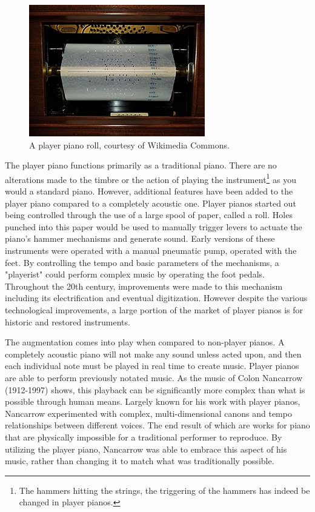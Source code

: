 \begin{figure}
    \centering
    \includegraphics[scale=0.8]{diagrams/PlayerPianoRoll.jpg}
    \caption{A player piano roll, courtesy of Wikimedia Commons.}
    \label{fig:pianoroll} %
\end{figure}

The player piano functions primarily as a traditional piano. There are no alterations made to the timbre or the action of playing the instrument\footnote{The hammers hitting the strings, the triggering of the hammers has indeed be changed in player pianos.} as you would a standard piano. However, additional features have been added to the player piano compared to a completely acoustic one. Player pianos started out being controlled through the use of a large spool of paper, called a roll\cite{plpHist}. Holes punched into this paper would be used to manually trigger levers to actuate the piano's hammer mechanisms and generate sound. Early versions of these instruments were operated with a manual pneumatic pump, operated with the feet\cite{plpHist}. By controlling the tempo and basic parameters of the mechanisms, a "playerist" could perform complex music by operating the foot pedals\cite{plpHist}. Throughout the 20th century, improvements were made to this mechanism including its electrification and eventual digitization\cite{modernPPBasics}. However despite the various technological improvements, a large portion of the market of player pianos is for historic and restored instruments.

The augmentation comes into play when compared to non-player pianos. A completely acoustic piano will not make any sound unless acted upon, and then each individual note must be played in real time to create music. Player pianos are able to perform previously notated music. As the music of Colon Nancarrow (1912-1997) shows, this playback can be significantly more complex than what is possible through human means. Largely known for his work with player pianos, Nancarrow experimented with complex, multi-dimensional canons and tempo relationships between different voices. The end result of which are works for piano that are physically impossible for a traditional performer to reproduce. By utilizing the player piano, Nancarrow was able to embrace this aspect of his music, rather than changing it to match what was traditionally possible.

